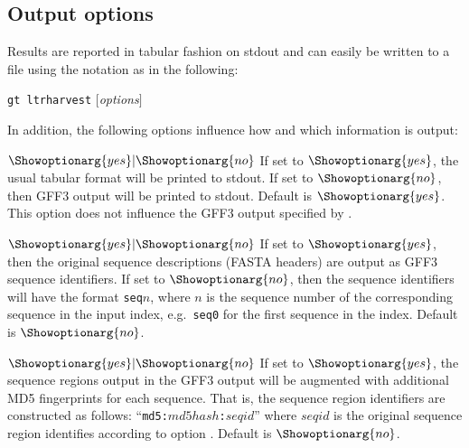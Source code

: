 \documentclass[12pt,titlepage]{article}
\newcommand{\Gtltrharvest}{\texttt{gt ltrharvest}\xspace}
\begin{document}
\subsection{Output options}

Results are reported in tabular fashion on stdout and can easily
be written to a file using the notation \texttt{}
 as in the following:

\Gtltrharvest {} 
$[$\emph{options}$]$ \texttt{} 

In addition, the following options influence how and which information is
output:
\begin{Justshowoptions}




{$\Showoptionarg{yes}|\Showoptionarg{no}$}{
If set to $\Showoptionarg{yes}$, the usual tabular format will be printed to
stdout. If set to $\Showoptionarg{no}$, then GFF3 output will be printed to
stdout. Default is $\Showoptionarg{yes}$. This option does not influence the
GFF3 output specified by .
}

{$\Showoptionarg{yes}|\Showoptionarg{no}$}{
If set to $\Showoptionarg{yes}$, then the original sequence descriptions (FASTA
headers) are output as GFF3 sequence identifiers.
If set to $\Showoptionarg{no}$, then the sequence identifiers will have the
format  \texttt{seq}$n$, where $n$ is the sequence number of the corresponding
sequence in the input index, e.g.\ \texttt{seq0} for the first sequence in the
index. Default is $\Showoptionarg{no}$.
}

{$\Showoptionarg{yes}|\Showoptionarg{no}$}{
If set to $\Showoptionarg{yes}$, the sequence regions output in the GFF3 output will
be augmented with additional MD5 fingerprints for each sequence.
That is, the sequence region identifiers are constructed as follows:
``\texttt{md5:}$md5hash$\texttt{:}$seqid$'' where $seqid$ is the original
sequence region identifies according to option .
Default is $\Showoptionarg{no}$.
}


\end{Justshowoptions}
\end{document}
